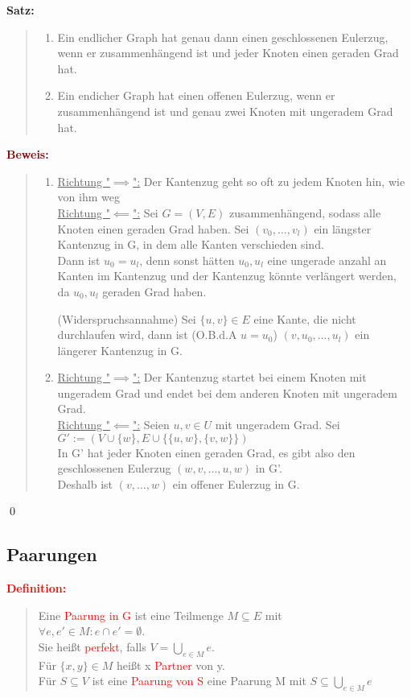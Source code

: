 \documentclass{article}
\newcommand{\red}[1]{\textcolor{red}{#1}}
\newcommand{\dgr}[1]{\textcolor{dgr}{#1}}
\newcommand{\maroon}[1]{\textcolor{maroon}{#1}}
\newcommand{\de}[1]{\red{\textbf{Definition: }}\begin{quote}#1\end{quote}}
\newcommand{\se}[1]{\dgr{\textbf{Satz: }}\begin{quote}#1\end{quote}}
\newcommand{\pr}[1]{\maroon{\textbf{Beweis: }}\begin{quote}#1\end{quote}\qed}
\begin{document}
\newpage
\se{
    \begin{enumerate}
        \item Ein endlicher Graph hat genau dann einen geschlossenen Eulerzug, wenn er zusammenhängend ist und jeder Knoten einen geraden Grad hat.
        \item Ein endicher Graph hat einen offenen Eulerzug, wenn er zusammenhängend ist und genau zwei Knoten mit ungeradem Grad hat.
    \end{enumerate}
}

\pr{
    \begin{enumerate}
        \item \underline{Richtung "$\implies$":} Der Kantenzug geht so oft zu jedem Knoten hin, wie von ihm weg\\
        \underline{Richtung "$\impliedby$":} Sei $G =(V,E)$ zusammenhängend, sodass alle Knoten einen geraden Grad haben. Sei $(v_0, \dots, v_l)$ ein längster Kantenzug in G, in dem alle Kanten verschieden sind.\\
        Dann ist $u_0 = u_l$, denn sonst hätten $u_0,u_l$ eine ungerade anzahl an Kanten im Kantenzug und der Kantenzug könnte verlängert werden, da $u_0,u_l$ geraden Grad haben.

        (Widerspruchsannahme) Sei $\{u,v\} \in E$ eine Kante, die nicht durchlaufen wird, dann ist (O.B.d.A $u = u_0$) $(v,u_0,\dots,u_l)$ ein längerer Kantenzug in G.

        \item \underline{Richtung "$\implies$":} Der Kantenzug startet bei einem Knoten mit ungeradem Grad und endet bei dem anderen Knoten mit ungeradem Grad.\\
        \underline{Richtung "$\impliedby$":} Seien $u,v \in U$ mit ungeradem Grad. Sei $G':=(V \cup \{w\}, E \cup \{\{u,w\}, \{v,w\}\})$\\
        In G' hat jeder Knoten einen geraden Grad, es gibt also den geschlossenen Eulerzug $(w,v,\dots,u,w)$ in G'.\\
        Deshalb ist $(v,\dots,w)$ ein offener Eulerzug in G.
    \end{enumerate}
}

\subsection{Paarungen}

\de{
    Eine \red{Paarung in G} ist eine Teilmenge $M \subseteq E$ mit\\
    $\forall e, e' \in M: e \cap e' = \emptyset$.\\
    Sie heißt \red{perfekt}, falls $V = \bigcup_{e \in M} e$.\\
    Für $\{x,y\} \in M$ heißt x \red{Partner} von y.\\
    Für $S \subseteq V$ ist eine \red{Paarung von S} eine Paarung M mit $S \subseteq \bigcup_{e \in M} e$
}
\end{document}
